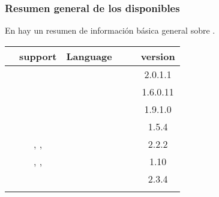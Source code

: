 \subsubsection{Resumen general de los \frameworksPC disponibles}

En  hay un resumen de información básica general sobre \shoppingCarts.

\begin{table}[H]
    \tiny
    \centering
\begin{tabular}{ |l|c|c|c|c|c| }

\hline
	&
	\freePC \dataBaseDB \backendAS support&
	Language&
	\wafAS&
	\License&
	version

\\ \hline
	\nameOpenCart &
	\mysqlNAME&
	\phpNAME&
	&
	\gplthreelicense &
	2.0.1.1
	
\\ \hline
	\namePrestaShop &
	\mysqlNAME&
	\phpNAME&
	&
	\opslicense &
	1.6.0.11
	
\\ \hline
	\nameMagento &
	\mysqlNAME&
	\phpNAME&
	\zendNAME \cite{online_zend_framework}&
	\opslicense &
	1.9.1.0
	
\\ \hline
	\nameZenCart &
	\mysqlNAME&
	\phpNAME&
	&
	\gpllicense &
	1.5.4
 
\\ \hline
	\nameSpreeCommerce &
	\mysqlNAME, \postgresql, \sqlitethree&
	\rubyNAME \cite{online_ruby_language}&
	\rubyonrailsNAME \cite{online_ruby_rails}&
	\bsdthreelicense&
	2.2.2

\\ \hline
	\nameDrupalCommerce &
	\mysqlNAME, \postgresql, \sqlitethree&
	\phpNAME&
	\drupalNAME \cite{online_drupal_official_site}&
	\gpllicense &
	1.10
	
\\ \hline
	\nameOsCommerce &
	\mysqlNAME&
	\phpNAME&
	&
	\gpllicense &
	2.3.4

\\ \hline
	\nameSimpleCart &
	&
	&
	&
	&
	

\end{tabular}
\end{table}
